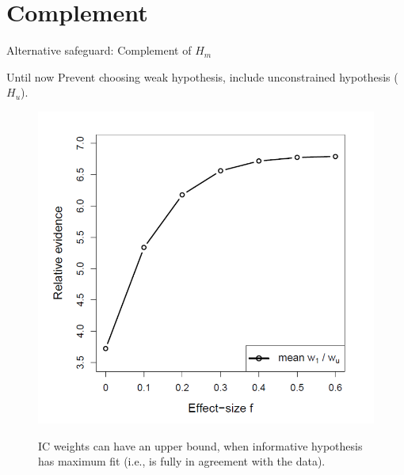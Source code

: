 \documentclass[10pt]{beamer}\usepackage[]{graphicx}\usepackage[]{xcolor}
\begin{document}
\section{Complement}
%
%
\begin{frame}{Alternative safeguard: Complement of $H_m$}%
	\begin{block}{Until now}
		Prevent choosing weak hypothesis, include unconstrained hypothesis ($H_u$).
	\end{block}
	
	\begin{figure}
		\centering
		\includegraphics[scale = 0.2]{MaxWeigth.png}\\
		\caption{IC weights can have an upper bound, when informative hypothesis has maximum fit (i.e., is fully in agreement with the data).}
	\end{figure}
\end{frame}
%
\end{document}
